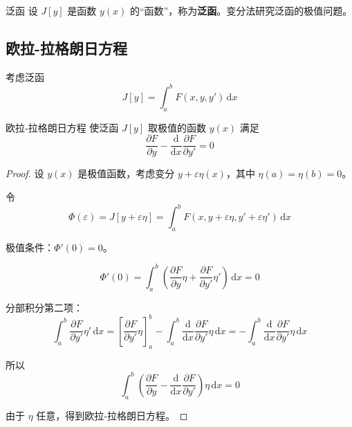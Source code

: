 \begin{dingliyi}{}{泛函}
设 $J[y]$ 是函数 $y(x)$ 的“函数”，称为\textbf{泛函}。变分法研究泛函的极值问题。
\end{dingliyi}

\subsection{欧拉-拉格朗日方程}

考虑泛函
\begin{equation}
    J[y] = \int_a^b F(x, y, y')\,\mathrm{d}x
\end{equation}

\begin{dingli}{}{欧拉-拉格朗日方程}
使泛函 $J[y]$ 取极值的函数 $y(x)$ 满足
\[
    \frac{\partial F}{\partial y} - \frac{\mathrm{d}}{\mathrm{d}x}\frac{\partial F}{\partial y'} = 0
\]
\end{dingli}

\begin{proof}
设 $y(x)$ 是极值函数，考虑变分 $y + \varepsilon\eta(x)$，其中 $\eta(a) = \eta(b) = 0$。

令
\begin{equation}
    \Phi(\varepsilon) = J[y + \varepsilon\eta] = \int_a^b F(x, y + \varepsilon\eta, y' + \varepsilon\eta')\,\mathrm{d}x
\end{equation}

极值条件：$\Phi'(0) = 0$。

\begin{equation}
    \Phi'(0) = \int_a^b \left(\frac{\partial F}{\partial y}\eta + \frac{\partial F}{\partial y'}\eta'\right)\,\mathrm{d}x = 0
\end{equation}

分部积分第二项：
\begin{equation}
    \int_a^b \frac{\partial F}{\partial y'}\eta'\,\mathrm{d}x = \left[\frac{\partial F}{\partial y'}\eta\right]_a^b - \int_a^b \frac{\mathrm{d}}{\mathrm{d}x}\frac{\partial F}{\partial y'}\eta\,\mathrm{d}x = -\int_a^b \frac{\mathrm{d}}{\mathrm{d}x}\frac{\partial F}{\partial y'}\eta\,\mathrm{d}x
\end{equation}

所以
\begin{equation}
    \int_a^b \left(\frac{\partial F}{\partial y} - \frac{\mathrm{d}}{\mathrm{d}x}\frac{\partial F}{\partial y'}\right)\eta\,\mathrm{d}x = 0
\end{equation}

由于 $\eta$ 任意，得到欧拉-拉格朗日方程。
\end{proof}

